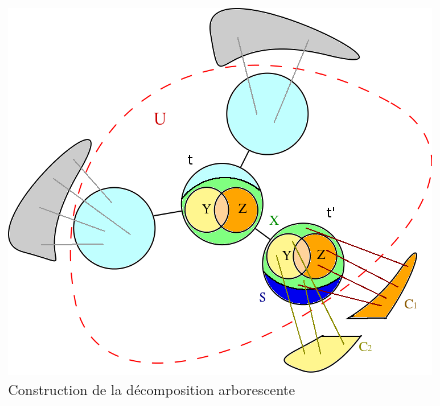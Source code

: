 
\begin{figure}[H]
\begin{center}
\includegraphics[scale=0.4]{res/twbuild3}
\end{center}
\caption{Construction de la décomposition arborescente}
\label{fig_twbuild2}
\end{figure}

